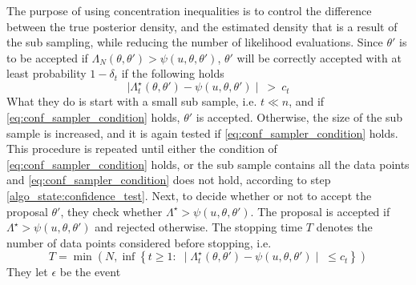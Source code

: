 The purpose of using concentration inequalities is to control the difference between the true posterior density, and the estimated density that is a result of the sub sampling, while reducing the number of likelihood evaluations. 
Since $\theta'$ is to be accepted if $\Lambda_N\left(\theta, \theta'\right) > \psi\left(u, \theta, \theta'\right)$,  $\theta'$ will be correctly accepted with at least probability $1 - \delta_t$ if  the following holds 
\begin{equation}\label{eq:conf_sampler_condition}   \mid\Lambda_t^{\star}\left(\theta, \theta'\right) - \psi\left(u, \theta, \theta'\right)\mid \:>\: c_t
\end{equation}
What they do is start with a small sub sample, i.e. $t \ll n$, and if \eqref{eq:conf_sampler_condition} holds, $\theta'$ is accepted. 
Otherwise, the size of the sub sample is increased, and it is again tested if \eqref{eq:conf_sampler_condition} holds.
This procedure is repeated until either the condition of \eqref{eq:conf_sampler_condition} holds, or the sub sample contains all the data points and \eqref{eq:conf_sampler_condition} does not hold, according to step \ref{algo_state:confidence_test}. 
Next, to decide whether or not to accept the proposal $\theta'$, 
they check whether $\Lambda^{\star} > \psi \left(u, \theta, \theta ' \right)$. 
The proposal is accepted if $\Lambda^{\star} >  \psi \left(u, \theta, \theta ' \right)$ and rejected otherwise.   
The stopping time $T$ denotes the number of data points considered before stopping, i.e. 
\begin{equation}\label{eq:T_stopping}
    T = \min\left(N, \inf\left\{t\geq 1 :\; \mid \Lambda_t^{\star}\left(\theta, \theta'\right) - \psi\left(u, \theta, \theta'\right)\mid \;\leq c_t\right\}\right)
\end{equation}
They let $\epsilon$ be the event

